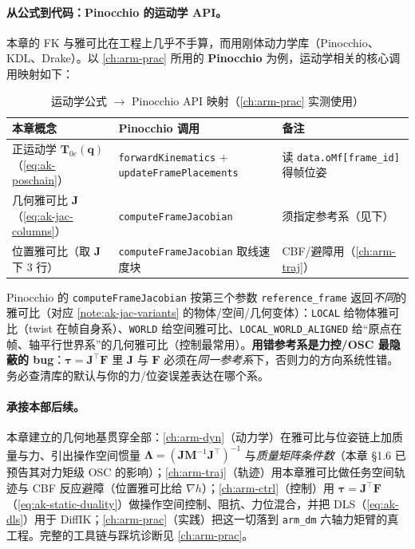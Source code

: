 \paragraph{从公式到代码：Pinocchio 的运动学 API。}
本章的 FK 与雅可比在工程上几乎不手算，而用刚体动力学库（Pinocchio、KDL、Drake）。以 \cref{ch:arm-prac} 所用的 \textbf{Pinocchio} 为例，运动学相关的核心调用映射如下\cite{lynch2017modern}：

\begin{table}[H]\centering\small
\caption{运动学公式 $\to$ Pinocchio API 映射（\cref{ch:arm-prac} 实测使用）}
\label{tab:ak-pinocchio}
\begin{tabular}{p{} p{} p{}}
\toprule
本章概念 & Pinocchio 调用 & 备注 \\
\midrule
正运动学 $\mathbf{T}_{0e}(\mathbf{q})$（\cref{eq:ak-poschain}） & \texttt{forwardKinematics} + \texttt{updateFramePlacements} & 读 \texttt{data.\allowbreak oMf[frame\_id]} 得帧位姿 \\
几何雅可比 $\mathbf{J}$（\cref{eq:ak-jac-columns}） & \texttt{computeFrameJacobian} & 须指定参考系（见下）\\
位置雅可比（取 $\mathbf{J}$ 下 3 行） & \texttt{computeFrameJacobian} 取线速度块 & CBF/避障用（\cref{ch:arm-traj}）\\
\bottomrule
\end{tabular}
\end{table}

\begin{pitfall}
Pinocchio 的 \texttt{computeFrameJacobian} 按第三个参数 \texttt{reference\_frame} 返回\emph{不同}的雅可比（对应 \cref{note:ak-jac-variants} 的物体/空间/几何变体）：\texttt{LOCAL} 给物体雅可比（twist 在帧自身系）、\texttt{WORLD} 给空间雅可比、\texttt{LOCAL\_WORLD\_ALIGNED} 给“原点在帧、轴平行世界系”的几何雅可比（控制最常用）。\textbf{用错参考系是力控/OSC 最隐蔽的 bug}：$\boldsymbol{\tau}=\mathbf{J}^\top\mathbf{F}$ 里 $\mathbf{J}$ 与 $\mathbf{F}$ 必须在\emph{同一参考系}下，否则力的方向系统性错。务必查清库的默认与你的力/位姿误差表达在哪个系。
\end{pitfall}

\paragraph{承接本部后续。}
本章建立的几何地基贯穿全部：\cref{ch:arm-dyn}（动力学）在雅可比与位姿链上加质量与力、引出操作空间惯量 $\boldsymbol{\Lambda}=(\mathbf{J}\mathbf{M}^{-1}\mathbf{J}^\top)^{-1}$ 与\emph{质量矩阵条件数}（本章 §1.6 已预告其对力矩级 OSC 的影响）；\cref{ch:arm-traj}（轨迹）用本章雅可比做任务空间轨迹与 CBF 反应避障（位置雅可比给 $\nabla h$）；\cref{ch:arm-ctrl}（控制）用 $\boldsymbol{\tau}=\mathbf{J}^\top\mathbf{F}$（\cref{eq:ak-static-duality}）做操作空间控制、阻抗、力位混合，并把 DLS（\cref{eq:ak-dls}）用于 DiffIK；\cref{ch:arm-prac}（实践）把这一切落到 \texttt{arm\_dm} 六轴力矩臂的真工程。完整的工具链与踩坑诊断见 \cref{ch:arm-prac}。

